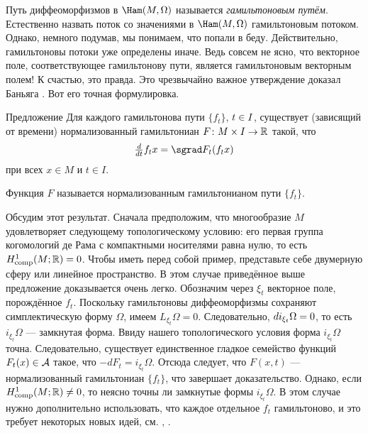 Путь диффеоморфизмов в $\Ham (M, \Omega)$ называется \emph{гамильтоновым путём}.
Естественно назвать поток со значениями в $\Ham (M, \Omega)$ гамильтоновым потоком.
Однако, немного подумав, мы понимаем, что попали в беду.
Действительно, гамильтоновы потоки уже определены иначе.
Ведь совсем не ясно, что векторное поле, соответствующее гамильтонову пути, является гамильтоновым векторным полем!
К счастью, это правда.
Это чрезвычайно важное утверждение доказал Баньяга \cite{B1}.
Вот его точная формулировка.

\begin{thm}{Предложение}\label{1.4.B}
Для каждого гамильтонова пути $\{f_t\}$, $t \z\in I$, существует (зависящий от времени) нормализованный гамильтониан $F\colon M \times I \to \mathbb{R}$ такой, что 
\[\tfrac \d{\d t} f_t x = \sgrad F_t (f_t x)\]
при всех $x \in M$ и $t \in I$.
\end{thm}

Функция $F$ называется нормализованным гамильтонианом
пути $\{f_t\}$.

Обсудим этот результат.
Сначала предположим, что многообразие $M$ удовлетворяет следующему
топологическому условию: его первая группа когомологий де Рама с компактными носителями равна нулю, то есть $H_{\mathrm{comp}}^1(M;\mathbb{R}) = 0$.
Чтобы иметь перед собой пример, представьте себе двумерную сферу или линейное пространство.
В этом случае приведённое выше предложение доказывается очень легко.
Обозначим через $\xi_t$ векторное поле, порождённое $f_t$.
Поскольку гамильтоновы диффеоморфизмы сохраняют симплектическую форму $\Omega$, имеем $L_{\xi_t} \Omega = 0$.
Следовательно, $d i_{\xi_t} \Omega = 0$, то есть $i_{\xi_t} \Omega$ — замкнутая форма.
Ввиду нашего топологического условия форма $i_{\xi_t} \Omega$ точна.
Следовательно, существует единственное гладкое семейство функций $F_t (x) \in \mathcal{A}$ такое, что $-dF_t = i_{\xi_t} \Omega$.
Отсюда следует, что $F (x, t)$ — нормализованный гамильтониан $\{f_t\}$, что завершает доказательство.
Однако, если $H^1_{\mathrm{comp}} (M;\mathbb{R}) \ne 0$, то неясно точны ли замкнутые формы $i_{\xi_t} \Omega$.
В этом случае нужно дополнительно использовать, что каждое отдельное $f_t$ гамильтоново, и это требует некоторых новых идей, см. \cite{B1}, \cite{MS}.

